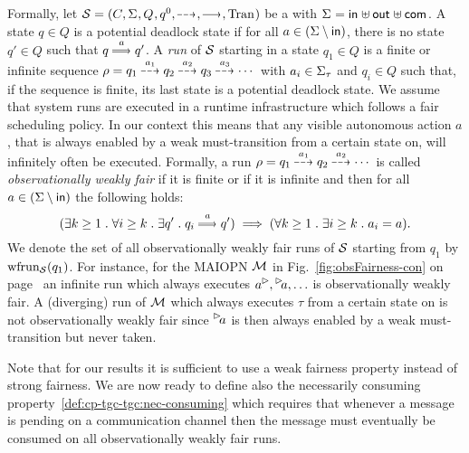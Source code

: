 Formally, let $\S = \maiotstup{}$ be a \MAIOTS with $\ioalpha{}$. A state $q \in Q$ is a potential deadlock state
if for all $a \in (\Sigma \setminus \inset)$, %
there is no state $q' \in Q$ such that $q \mustw{a} q'$. 
A \emph{run} of $\S$ starting in a state $q_1 \in Q$ is a finite or infinite sequence $\rho =q_1  \may{a_1} q_2 \may{a_2} q_3 \may{a_3} \cdots$ with $a_i \in \Sigmat$ and $q_i \in Q$ %
such that, if the sequence is finite, its last state is a potential deadlock state.
We assume that system runs are executed in a runtime infrastructure which follows a fair scheduling policy. In our context this means that any visible autonomous action $a$, that is always enabled by a weak must-transition from a certain state on, will infinitely often be executed. 
Formally, a run $\rho = q_1 \may{a_1} q_2 \may{a_2} \cdots$ %
is called \emph{observationally weakly fair} if it is finite or if it is infinite and then for all $a \in (\Sigma \setminus \inset)$ the following holds:
\[
    (\exists k \geq 1\;.\; \forall i \geq k \;.\; \exists q'  \;.\; q_i \mustw{a} q') \implies (\forall k \geq 1 \;.\; \exists i \geq k \;.\; a_i = a).
\]
\noindent We denote the set of all observationally weakly fair runs of $\S$ starting from $q_1$ by $\frun{\S}(q_1)$.
For instance, for the MAIOPN $\M$ in Fig.~\ref{fig:obsFairness-con} on page~\pageref{fig:obsFairness-con} an infinite run which always executes
$\outact{a}, \inact{a}, \ldots$ is observationally weakly fair.
A (diverging) run of $\M$ which always executes $\tau$ from a certain state on
is not observationally weakly fair since $\inact{a}$ is then always enabled by a weak must-transition but never taken.

Note that for our results it is sufficient to use a weak fairness property instead of strong fairness.
We are now ready to define also the necessarily consuming property~\ref{def:cp-tgc-tgc:nec-consuming} which requires
that whenever a message is pending on a communication channel then the message must eventually be consumed on
all observationally weakly fair runs.%

